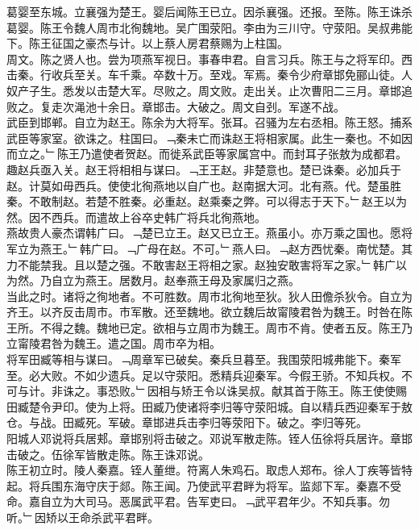 \documentclass{zhvt-classic}
\begin{document}
\hspace*{2em}葛婴至东城。立襄强为楚王。婴后闻陈王已立。因杀襄强。还报。至陈。陈王诛杀葛婴。陈王令魏人周市北徇魏地。吴广围荥阳。李由为三川守。守荥阳。吴叔弗能下。陈王征国之豪杰与计。以上蔡人房君蔡赐为上柱国。\\
\hspace*{2em}周文。陈之贤人也。尝为项燕军视日。事春申君。自言习兵。陈王与之将军印。西击秦。行收兵至关。车千乘。卒数十万。至戏。军焉。秦令少府章邯免郦山徒。人奴产子生。悉发以击楚大军。尽败之。周文败。走出关。止次曹阳二三月。章邯追败之。复走次渑池十余日。章邯击。大破之。周文自刭。军遂不战。\\
\hspace*{2em}武臣到邯郸。自立为赵王。陈余为大将军。张耳。召骚为左右丞相。陈王怒。捕系武臣等家室。欲诛之。柱国曰。﹁秦未亡而诛赵王将相家属。此生一秦也。不如因而立之。﹂陈王乃遣使者贺赵。而徙系武臣等家属宫中。而封耳子张敖为成都君。趣赵兵亟入关。赵王将相相与谋曰。﹁王王赵。非楚意也。楚已诛秦。必加兵于赵。计莫如毋西兵。使使北徇燕地以自广也。赵南据大河。北有燕。代。楚虽胜秦。不敢制赵。若楚不胜秦。必重赵。赵乘秦之弊。可以得志于天下。﹂赵王以为然。因不西兵。而遣故上谷卒史韩广将兵北徇燕地。\\
\hspace*{2em}燕故贵人豪杰谓韩广曰。﹁楚已立王。赵又已立王。燕虽小。亦万乘之国也。愿将军立为燕王。﹂韩广曰。﹁广母在赵。不可。﹂燕人曰。﹁赵方西忧秦。南忧楚。其力不能禁我。且以楚之强。不敢害赵王将相之家。赵独安敢害将军之家。﹂韩广以为然。乃自立为燕王。居数月。赵奉燕王母及家属归之燕。\\
\hspace*{2em}当此之时。诸将之徇地者。不可胜数。周市北徇地至狄。狄人田儋杀狄令。自立为齐王。以齐反击周市。市军散。还至魏地。欲立魏后故甯陵君咎为魏王。时咎在陈王所。不得之魏。魏地已定。欲相与立周市为魏王。周市不肯。使者五反。陈王乃立甯陵君咎为魏王。遣之国。周市卒为相。\\
\hspace*{2em}将军田臧等相与谋曰。﹁周章军已破矣。秦兵旦暮至。我围荥阳城弗能下。秦军至。必大败。不如少遗兵。足以守荥阳。悉精兵迎秦军。今假王骄。不知兵权。不可与计。非诛之。事恐败。﹂因相与矫王令以诛吴叔。献其首于陈王。陈王使使赐田臧楚令尹印。使为上将。田臧乃使诸将李归等守荥阳城。自以精兵西迎秦军于敖仓。与战。田臧死。军破。章邯进兵击李归等荥阳下。破之。李归等死。\\
\hspace*{2em}阳城人邓说将兵居郏。章邯别将击破之。邓说军散走陈。铚人伍徐将兵居许。章邯击破之。伍徐军皆散走陈。陈王诛邓说。\\
\hspace*{2em}陈王初立时。陵人秦嘉。铚人董绁。符离人朱鸡石。取虑人郑布。徐人丁疾等皆特起。将兵围东海守庆于郯。陈王闻。乃使武平君畔为将军。监郯下军。秦嘉不受命。嘉自立为大司马。恶属武平君。告军吏曰。﹁武平君年少。不知兵事。勿听。﹂因矫以王命杀武平君畔。\\
\end{document}
